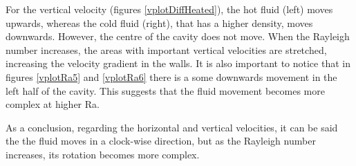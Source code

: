 For the vertical velocity (figures \ref{vplotDiffHeated}), the hot fluid (left) moves upwards, whereas the cold fluid (right), that has a higher density, moves downwards. However, the centre of the cavity does not move. When the Rayleigh number increases, the areas with important vertical velocities are stretched, increasing the velocity gradient in the walls. It is also important to notice that in figures \ref{vplotRa5} and \ref{vplotRa6} there is a some downwards movement in the left half of the cavity. This suggests that the fluid movement becomes more complex at higher Ra.

As a conclusion, regarding the horizontal and vertical velocities, it can be said the the fluid moves in a clock-wise direction, but as the Rayleigh number increases, its rotation becomes more complex.

